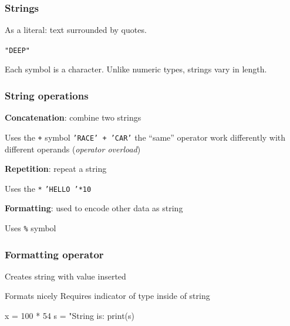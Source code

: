 \documentclass[11pt]{beamer}
\begin{document}
\begin{frame}
  \frametitle{Strings}
  \Enlarge

  \begin{itemize}
  \myitem  As a literal:  text surrounded by quotes.
    \begin{itemize}
    \mysubitem  \texttt{"DEEP"}
    \end{itemize} \pause
  \myitem  Each symbol is a character. \pause
  \myitem  Unlike numeric types, strings vary in length.
  \end{itemize}
\end{frame}

\begin{frame}
  \frametitle{String operations}
  \Enlarge

  \begin{itemize}
  \myitem  \textbf{Concatenation}:  combine two strings
    \begin{itemize}
    \mysubitem  Uses the \texttt{+} symbol
    \mysubitem  \texttt{'RACE' + 'CAR'} \pause
    \mysubitem the ``same'' operator work differently with different operands (\emph{operator overload})
    \end{itemize} \pause
  \myitem  \textbf{Repetition}:  repeat a string
    \begin{itemize}
    \mysubitem  Uses the \texttt{*}
    \mysubitem  \texttt{'HELLO '*10}
    \end{itemize} \pause
  \myitem  \textbf{Formatting}:  used to encode other data as string
    \begin{itemize}
    \mysubitem  Uses \texttt{\%} symbol
    \end{itemize}
  \end{itemize}
\end{frame}

\begin{frame}[fragile]
  \frametitle{Formatting operator}
  \Enlarge

  \begin{itemize}
  \myitem  Creates string with value inserted \pause
    \begin{itemize}
    \mysubitem  Formats nicely
    \mysubitem  Requires indicator of type inside of string
    \end{itemize} \pause
  \begin{semiverbatim}
x = 100 * 54
s = "String is: %
print(s)
  \end{semiverbatim}
  \end{itemize}
\end{frame}
\end{document}
